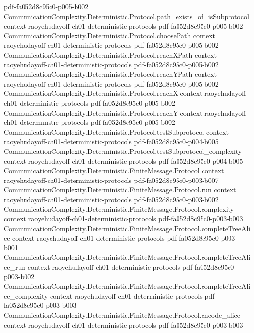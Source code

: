 \begin{lemma}
  {pdf-fa052d8c95c0-p005-b002}
\proofstep
  {CommunicationComplexity.Deterministic.Protocol.path_exists_of_isSubprotocol}
  {context}
  {raoyehudayoff-ch01-deterministic-protocols}
  {pdf-fa052d8c95c0-p005-b002}
\proofstep
  {CommunicationComplexity.Deterministic.Protocol.choosePath}
  {context}
  {raoyehudayoff-ch01-deterministic-protocols}
  {pdf-fa052d8c95c0-p005-b002}
\proofstep
  {CommunicationComplexity.Deterministic.Protocol.reachXPath}
  {context}
  {raoyehudayoff-ch01-deterministic-protocols}
  {pdf-fa052d8c95c0-p005-b002}
\proofstep
  {CommunicationComplexity.Deterministic.Protocol.reachYPath}
  {context}
  {raoyehudayoff-ch01-deterministic-protocols}
  {pdf-fa052d8c95c0-p005-b002}
\proofstep
  {CommunicationComplexity.Deterministic.Protocol.reachX}
  {context}
  {raoyehudayoff-ch01-deterministic-protocols}
  {pdf-fa052d8c95c0-p005-b002}
\proofstep
  {CommunicationComplexity.Deterministic.Protocol.reachY}
  {context}
  {raoyehudayoff-ch01-deterministic-protocols}
  {pdf-fa052d8c95c0-p005-b002}
\proofstep
  {CommunicationComplexity.Deterministic.Protocol.testSubprotocol}
  {context}
  {raoyehudayoff-ch01-deterministic-protocols}
  {pdf-fa052d8c95c0-p004-b005}
\proofstep
  {CommunicationComplexity.Deterministic.Protocol.testSubprotocol_complexity}
  {context}
  {raoyehudayoff-ch01-deterministic-protocols}
  {pdf-fa052d8c95c0-p004-b005}
\proofstep
  {CommunicationComplexity.Deterministic.FiniteMessage.Protocol}
  {context}
  {raoyehudayoff-ch01-deterministic-protocols}
  {pdf-fa052d8c95c0-p003-b007}
\proofstep
  {CommunicationComplexity.Deterministic.FiniteMessage.Protocol.run}
  {context}
  {raoyehudayoff-ch01-deterministic-protocols}
  {pdf-fa052d8c95c0-p003-b002}
\proofstep
  {CommunicationComplexity.Deterministic.FiniteMessage.Protocol.complexity}
  {context}
  {raoyehudayoff-ch01-deterministic-protocols}
  {pdf-fa052d8c95c0-p003-b003}
\proofstep
  {CommunicationComplexity.Deterministic.FiniteMessage.Protocol.completeTreeAlice}
  {context}
  {raoyehudayoff-ch01-deterministic-protocols}
  {pdf-fa052d8c95c0-p003-b001}
\proofstep
  {CommunicationComplexity.Deterministic.FiniteMessage.Protocol.completeTreeAlice_run}
  {context}
  {raoyehudayoff-ch01-deterministic-protocols}
  {pdf-fa052d8c95c0-p003-b002}
\proofstep
  {CommunicationComplexity.Deterministic.FiniteMessage.Protocol.completeTreeAlice_complexity}
  {context}
  {raoyehudayoff-ch01-deterministic-protocols}
  {pdf-fa052d8c95c0-p003-b003}
\proofstep
  {CommunicationComplexity.Deterministic.FiniteMessage.Protocol.encode_alice}
  {context}
  {raoyehudayoff-ch01-deterministic-protocols}
  {pdf-fa052d8c95c0-p003-b003}

\end{lemma}
